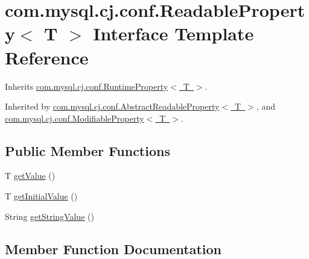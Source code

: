 \hypertarget{interfacecom_1_1mysql_1_1cj_1_1conf_1_1_readable_property}{}\section{com.\+mysql.\+cj.\+conf.\+Readable\+Property$<$ T $>$ Interface Template Reference}
\label{interfacecom_1_1mysql_1_1cj_1_1conf_1_1_readable_property}


Inherits \mbox{\hyperlink{interfacecom_1_1mysql_1_1cj_1_1conf_1_1_runtime_property}{com.\+mysql.\+cj.\+conf.\+Runtime\+Property$<$ T $>$}}.



Inherited by \mbox{\hyperlink{classcom_1_1mysql_1_1cj_1_1conf_1_1_abstract_readable_property}{com.\+mysql.\+cj.\+conf.\+Abstract\+Readable\+Property$<$ T $>$}}, and \mbox{\hyperlink{interfacecom_1_1mysql_1_1cj_1_1conf_1_1_modifiable_property}{com.\+mysql.\+cj.\+conf.\+Modifiable\+Property$<$ T $>$}}.

\subsection*{Public Member Functions}
\begin{DoxyCompactItemize}
\item 
T \mbox{\hyperlink{interfacecom_1_1mysql_1_1cj_1_1conf_1_1_readable_property_a602dfa3dbe87560a5ceca17a38f30844}{get\+Value}} ()
\item 
T \mbox{\hyperlink{interfacecom_1_1mysql_1_1cj_1_1conf_1_1_readable_property_af8f94a55a672bc15ef5169c07dcf8614}{get\+Initial\+Value}} ()
\item 
String \mbox{\hyperlink{interfacecom_1_1mysql_1_1cj_1_1conf_1_1_readable_property_a33c24e6ce00a092c5ab1929d241110ba}{get\+String\+Value}} ()
\end{DoxyCompactItemize}


\subsection{Member Function Documentation}
\mbox{\label{interfacecom_1_1mysql_1_1cj_1_1conf_1_1_readable_property_af8f94a55a672bc15ef5169c07dcf8614}} 
